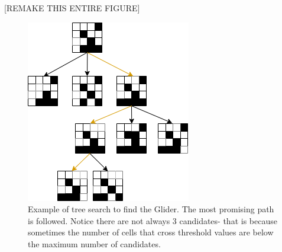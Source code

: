 \documentclass{l4proj}
\begin{document}
[REMAKE THIS ENTIRE FIGURE]
\begin{figure}[h]
\centering
\includegraphics[width=0.8\linewidth]{dissertation/images/diagrams/tree_diagram.png}
\caption{Example of tree search to find the Glider. The most promising path is followed. Notice there are not always 3 candidates- that is because sometimes the number of cells that cross threshold values are below the maximum number of candidates.}
\label{fig:subim1}
\end{figure}
\end{document}
